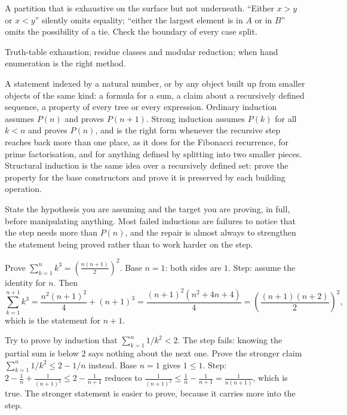 \begin{trap}
A partition that is exhaustive on the surface but not underneath. ``Either $x>y$ or $x<y$'' silently omits equality; ``either the largest element is in $A$ or in $B$'' omits the possibility of a tie. Check the boundary of every case split.
\end{trap}

\begin{seealsob}Truth-table exhaustion; residue classes and modular reduction; when hand enumeration is the right method.\end{seealsob}

\cue A statement indexed by a natural number, or by any object built up from smaller objects of the same kind: a formula for a sum, a claim about a recursively defined sequence, a property of every tree or every expression.
\method Ordinary induction assumes $P(n)$ and proves $P(n+1)$. Strong induction assumes $P(k)$ for all $k<n$ and proves $P(n)$, and is the right form whenever the recursive step reaches back more than one place, as it does for the Fibonacci recurrence, for prime factorisation, and for anything defined by splitting into two smaller pieces. Structural induction is the same idea over a recursively defined set: prove the property for the base constructors and prove it is preserved by each building operation.

\begin{keynote}
State the hypothesis you are assuming and the target you are proving, in full, before manipulating anything. Most failed inductions are failures to notice that the step needs more than $P(n)$, and the repair is almost always to strengthen the statement being proved rather than to work harder on the step.
\end{keynote}

\begin{worked}
Prove $\sum_{k=1}^{n}k^{3}=\left(\frac{n(n+1)}{2}\right)^{2}$. Base $n=1$: both sides are $1$. Step: assume the identity for $n$. Then
\[
\sum_{k=1}^{n+1}k^{3}=\frac{n^{2}(n+1)^{2}}{4}+(n+1)^{3}=\frac{(n+1)^{2}\left(n^{2}+4n+4\right)}{4}=\left(\frac{(n+1)(n+2)}{2}\right)^{2},
\]
which is the statement for $n+1$.
\end{worked}

\begin{worked}
Try to prove by induction that $\sum_{k=1}^{n}1/k^{2}<2$. The step fails: knowing the partial sum is below $2$ says nothing about the next one. Prove the stronger claim $\sum_{k=1}^{n}1/k^{2}\leq 2-1/n$ instead. Base $n=1$ gives $1\leq1$. Step: $2-\frac1n+\frac{1}{(n+1)^{2}}\leq 2-\frac{1}{n+1}$ reduces to $\frac{1}{(n+1)^{2}}\leq\frac{1}{n}-\frac{1}{n+1}=\frac{1}{n(n+1)}$, which is true. The stronger statement is easier to prove, because it carries more into the step.
\end{worked}

